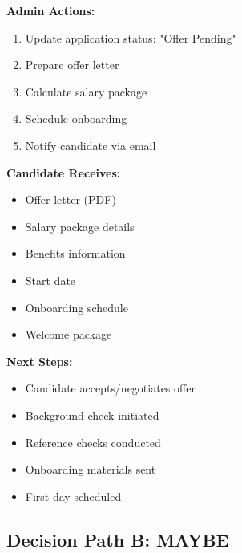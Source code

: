 \documentclass[12pt,a4paper]{article}
\begin{document}
\begin{tcolorbox}[colback=successgreen!5,colframe=successgreen,title=\textbf{Hire Decision Process}]

\textbf{Admin Actions:}
\begin{enumerate}
    \item Update application status: "Offer Pending"
    \item Prepare offer letter
    \item Calculate salary package
    \item Schedule onboarding
    \item Notify candidate via email
\end{enumerate}

\textbf{Candidate Receives:}
\begin{itemize}
    \item Offer letter (PDF)
    \item Salary package details
    \item Benefits information
    \item Start date
    \item Onboarding schedule
    \item Welcome package
\end{itemize}

\textbf{Next Steps:}
\begin{itemize}
    \item Candidate accepts/negotiates offer
    \item Background check initiated
    \item Reference checks conducted
    \item Onboarding materials sent
    \item First day scheduled
\end{itemize}

\end{tcolorbox}

\newpage

\subsection{Decision Path B: MAYBE}
\end{document}
